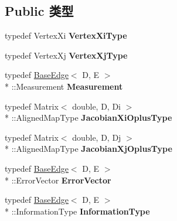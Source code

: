 \subsection*{Public 类型}
\begin{DoxyCompactItemize}
\item 
\hypertarget{classg2o_1_1BaseBinaryEdge_aa8e2b04b2c0c90adc48384d6d41063cc}{typedef Vertex\-Xi {\bfseries Vertex\-Xi\-Type}}\label{classg2o_1_1BaseBinaryEdge_aa8e2b04b2c0c90adc48384d6d41063cc}

\item 
\hypertarget{classg2o_1_1BaseBinaryEdge_aa489ae37680c37d7b2c3c1a197f90de9}{typedef Vertex\-Xj {\bfseries Vertex\-Xj\-Type}}\label{classg2o_1_1BaseBinaryEdge_aa489ae37680c37d7b2c3c1a197f90de9}

\item 
\hypertarget{classg2o_1_1BaseBinaryEdge_ac1e9249e9906747a6669a9c90013944b}{typedef \hyperlink{classg2o_1_1BaseEdge}{Base\-Edge}$<$ D, E $>$\\*
\-::Measurement {\bfseries Measurement}}\label{classg2o_1_1BaseBinaryEdge_ac1e9249e9906747a6669a9c90013944b}

\item 
\hypertarget{classg2o_1_1BaseBinaryEdge_ab1cde84224b129603bcd95db027e0167}{typedef Matrix$<$ double, D, Di $>$\\*
\-::Aligned\-Map\-Type {\bfseries Jacobian\-Xi\-Oplus\-Type}}\label{classg2o_1_1BaseBinaryEdge_ab1cde84224b129603bcd95db027e0167}

\item 
\hypertarget{classg2o_1_1BaseBinaryEdge_a83e5dec2135b33e86255c87be3b5d062}{typedef Matrix$<$ double, D, Dj $>$\\*
\-::Aligned\-Map\-Type {\bfseries Jacobian\-Xj\-Oplus\-Type}}\label{classg2o_1_1BaseBinaryEdge_a83e5dec2135b33e86255c87be3b5d062}

\item 
\hypertarget{classg2o_1_1BaseBinaryEdge_ae1cccf6068b2446ece316b6a69a46acf}{typedef \hyperlink{classg2o_1_1BaseEdge}{Base\-Edge}$<$ D, E $>$\\*
\-::Error\-Vector {\bfseries Error\-Vector}}\label{classg2o_1_1BaseBinaryEdge_ae1cccf6068b2446ece316b6a69a46acf}

\item 
\hypertarget{classg2o_1_1BaseBinaryEdge_a4530ef6462aadaf2ab826d440d3b3318}{typedef \hyperlink{classg2o_1_1BaseEdge}{Base\-Edge}$<$ D, E $>$\\*
\-::Information\-Type {\bfseries Information\-Type}}\label{classg2o_1_1BaseBinaryEdge_a4530ef6462aadaf2ab826d440d3b3318}


\end{DoxyCompactItemize}
